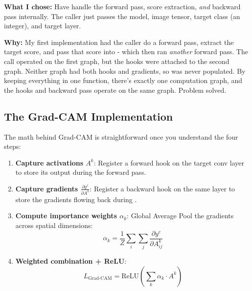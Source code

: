 \documentclass[9pt,a4paper,twocolumn,twoside]{tau-class/tau}
\begin{document}
        \begin{tauenv}[frametitle={Decision: Single Forward Pass Inside get\_gradcam}]
            \textbf{What I chose:} Have  handle the forward pass, score extraction, \textit{and} backward pass internally. The caller just passes the model, image tensor, target class (an integer), and target layer.

            \textbf{Why:} My first implementation had the caller do a forward pass, extract the target score, and pass that score into  - which then ran \textit{another} forward pass. The  call operated on the first graph, but the hooks were attached to the second graph. Neither graph had both hooks and gradients, so  was never populated. By keeping everything in one function, there's exactly one computation graph, and the hooks and backward pass operate on the same graph. Problem solved.
        \end{tauenv}

    \subsection{The Grad-CAM Implementation}

        The math behind Grad-CAM is straightforward once you understand the four steps:

        \begin{enumerate}
            \item \textbf{Capture activations $A^k$}: Register a forward hook on the target conv layer to store its output during the forward pass.

            \item \textbf{Capture gradients $\frac{\partial y^c}{\partial A^k}$}: Register a backward hook on the same layer to store the gradients flowing back during .

            \item \textbf{Compute importance weights $\alpha_k$}: Global Average Pool the gradients across spatial dimensions:
            $$\alpha_k = \frac{1}{Z} \sum_i \sum_j \frac{\partial y^c}{\partial A^k_{ij}}$$

            \item \textbf{Weighted combination + ReLU}:
            $$L_{\text{Grad-CAM}} = \text{ReLU}\left(\sum_k \alpha_k \cdot A^k\right)$$
        \end{enumerate}
\end{document}
